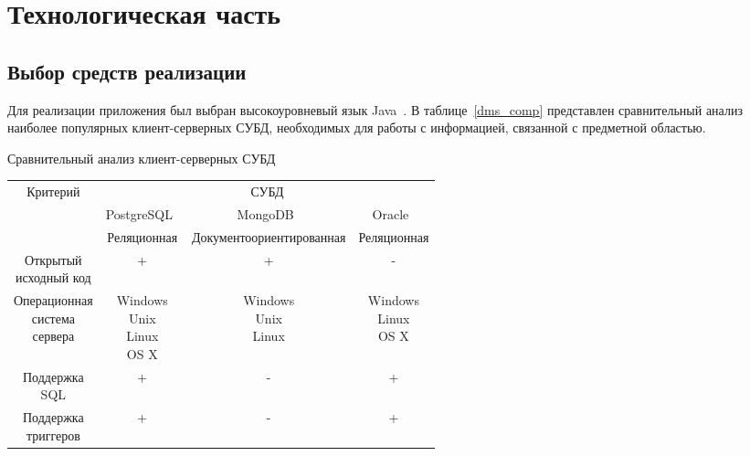 \chapter{Технологическая часть}

\section{Выбор средств реализации}

Для реализации приложения был выбран высокоуровневый язык Java~\cite{java}. В таблице~\ref{dms_comp} представлен сравнительный анализ наиболее популярных клиент-серверных СУБД, необходимых для работы с информацией, связанной с предметной областью.

\begin{center}
	\begin{threeparttable}
		\captionsetup{justification=raggedright,singlelinecheck=off}
		\caption{\label{dms_comp}Сравнительный анализ клиент-серверных СУБД}
		\centering
		\begin{tabular}{|c|c|c|c|}
			\hline
			\multirow{2}{*}{Критерий} & \multicolumn{3}{|c|}{СУБД} \\
			\cline{2-4}
			& PostgreSQL~\cite{postgresql} & MongoDB~\cite{mssql} & Oracle~\cite{oracle} \\
			\hline
			\specialcell{Тип} & Реляционная & Документоориентированная & Реляционная \\
			\hline
			\specialcell{Открытый\\исходный код} & + & + & - \\
			\hline
			\specialcell{Операционная\\система\\сервера} & \specialcell{Windows\\Unix\\Linux\\OS X} & \specialcell{Windows\\Unix\\Linux} & \specialcell{Windows\\Linux\\OS X} \\
			\hline
			\specialcell{Поддержка\\SQL} & + & - & + \\
			\hline
			\specialcell{Поддержка\\триггеров} & + & - & + \\
			\hline
		\end{tabular}
	\end{threeparttable}
\end{center}

